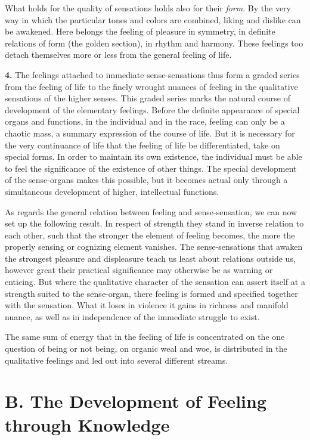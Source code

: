 \documentclass[12pt,a4paper]{book}
\newcommand{\opage}[1]{\marginnote{\footnotesize\textit{[#1]}}}
\begin{document}
What holds for the quality of sensations holds also for their
\emph{form}. By the very way in which the particular tones and colors are
combined, liking and dislike can be awakened. Here belongs the feeling
of pleasure in symmetry, in definite relations of form (the golden
section), in rhythm and harmony. These feelings too detach themselves
more or less from the general feeling of life.

\textbf{4.} The feelings attached to immediate sense-sensations thus
form a graded series from the feeling of life to the finely wrought
nuances of feeling in the qualitative sensations of the higher senses.
This graded series marks the natural course of development of the
elementary feelings. Before the definite appearance of special organs
and functions, in the individual and in the race, feeling can only be a
chaotic mass, a summary expression of the course of life. But it is
necessary for the very continuance of life that the feeling of life be
differentiated, take on special forms. In order to maintain its own
existence, the individual must be able to feel the significance of the
existence of other things. The special development of the sense-organs
makes this possible, but it becomes actual only through a simultaneous
development of higher, intellectual functions.

As regards the general relation between feeling and sense-sensation, we
can now set up the following result. In respect of strength they stand
in inverse relation to each other, such that the stronger the element of
feeling becomes, the more the properly sensing or cognizing element
vanishes. The sense-sensations that awaken the strongest pleasure and
displeasure teach us least about relations outside us, however great
their practical significance may otherwise be as warning or
\opage{281}enticing. But where the qualitative character of the sensation
can assert itself at a strength suited to the sense-organ, there feeling
is formed and specified together with the sensation. What it loses in
violence it gains in richness and manifold nuance, as well as in
independence of the immediate struggle to exist.

The same sum of energy that in the feeling of life is concentrated on
the one question of being or not being, on organic weal and woe, is
distributed in the qualitative feelings and led out into several
different streams.

\section*{B. The Development of Feeling through Knowledge}
\end{document}

